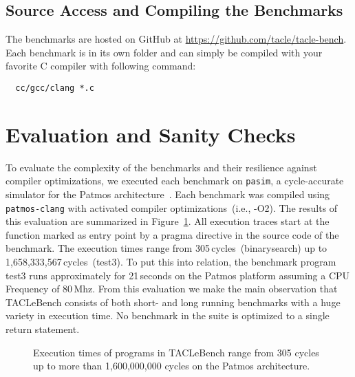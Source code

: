 \documentclass[a4paper,UKenglish]{oasics}
\begin{document}
\subsection{Source Access and Compiling the Benchmarks}

The benchmarks are hosted on GitHub at \url{https://github.com/tacle/tacle-bench}.
Each benchmark is in its own folder and can simply be compiled with your favorite
C compiler with following command:

\begin{verbatim}
  cc/gcc/clang *.c
\end{verbatim}


\section{Evaluation and Sanity Checks}
\label{sec:eval}
To evaluate the complexity of the benchmarks and their resilience against 
compiler optimizations, we executed each benchmark on \texttt{pasim}, a 
cycle-accurate simulator for the Patmos architecture~\cite{t-crest:2015}. Each 
benchmark was compiled using \texttt{patmos-clang} with activated compiler 
optimizations~(i.e., -O2). The results of this evaluation are summarized in 
Figure~\ref{fig:execution-times}. All execution traces start at the function 
marked as entry point by a pragma directive in the source code of the benchmark.
The execution times range from 305\,cycles~(binarysearch) up to 
1,658,333,567\,cycles~(test3).
To put this into relation, the benchmark program test3 runs approximately 
for 21\,seconds on the Patmos platform assuming a CPU Frequency of 80\,Mhz.
From this evaluation we make the main observation that 
TACLeBench consists of both short- and long running benchmarks with a huge variety in execution time. 
No benchmark in the suite is optimized to a single return statement.

\begin{figure}[t]
  \def\resultfile{eval/wcet.csv}
  
  \caption{Execution times of programs in TACLeBench range from 305 cycles up to more than 1,600,000,000 cycles on the Patmos architecture.}
  \label{fig:execution-times}
\end{figure}
\end{document}
